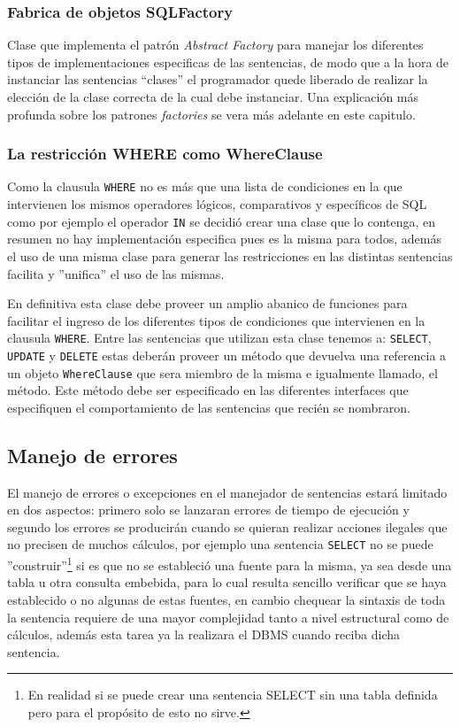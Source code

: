 \subsubsection{Fabrica de objetos SQLFactory}
Clase que implementa el patrón \textit{Abstract Factory} para manejar los diferentes tipos de implementaciones especificas de las sentencias, de modo que a la hora de instanciar las sentencias ``clases'' el programador quede liberado de realizar la elección de la clase correcta de la cual debe instanciar. Una explicación más profunda sobre los patrones \textit{factories} se vera más adelante en este capitulo.
%
\subsubsection{La restricción WHERE como WhereClause}
Como la clausula \verb=WHERE= no es más que una lista de condiciones en la que intervienen los mismos operadores lógicos, comparativos y específicos de SQL como por ejemplo el operador \verb=IN= se decidió crear una clase que lo contenga, en resumen no hay implementación especifica pues es la misma para todos, además el uso de una misma clase para generar las restricciones en las distintas sentencias facilita y ''unifica'' el uso de las mismas.

En definitiva esta clase debe proveer un amplio abanico de funciones para facilitar el ingreso de los diferentes tipos de condiciones que intervienen en la clausula \verb=WHERE=. Entre las sentencias que utilizan esta clase tenemos a: \verb=SELECT=, \verb=UPDATE= y \verb=DELETE= estas deberán proveer un método que devuelva una referencia a un objeto \verb=WhereClause= que sera miembro de la misma e igualmente llamado, el método. Este método debe ser especificado en las diferentes interfaces que especifiquen el comportamiento de las sentencias que recién se nombraron. 
%
\subsection{Manejo de errores}
El manejo de errores o excepciones en el manejador de sentencias estará limitado en dos aspectos: primero solo se lanzaran errores de tiempo de ejecución y segundo los errores se producirán cuando se quieran realizar acciones ilegales que no precisen de muchos cálculos, por ejemplo una sentencia \verb=SELECT= no se puede ''construir''\footnote{En realidad si se puede crear una sentencia SELECT sin una tabla definida pero para el propósito de \jj esto no sirve.} si es que no se estableció una fuente para la misma, ya sea  desde una tabla u otra consulta embebida, para lo cual resulta sencillo verificar que se haya establecido o no algunas de estas fuentes, en cambio chequear la sintaxis de toda la sentencia requiere de una mayor complejidad tanto a nivel estructural como de cálculos, además esta tarea ya la realizara el DBMS cuando reciba dicha sentencia.
%
